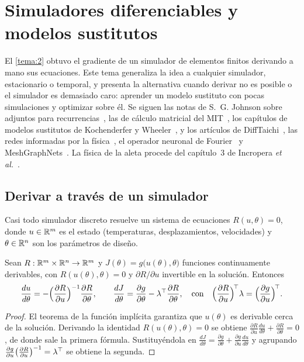 \chapter{Simuladores diferenciables y modelos sustitutos}
\label{tema:3}

El \cref{tema:2} obtuvo el gradiente de un simulador de elementos finitos derivando a mano sus ecuaciones. Este tema generaliza la idea a cualquier simulador, estacionario o temporal, y presenta la alternativa cuando derivar no es posible o el simulador es demasiado caro: aprender un modelo sustituto con pocas simulaciones y optimizar sobre él. Se siguen las notas de S.~G. Johnson sobre adjuntos para recurrencias~\cite{johnson}, las de cálculo matricial del MIT~\cite[§6.3]{mit18s096}, los capítulos de modelos sustitutos de Kochenderfer y Wheeler~\cite{kw}, y los artículos de DiffTaichi~\cite{difftaichi}, las redes informadas por la física~\cite{pinn}, el operador neuronal de Fourier~\cite{fno} y MeshGraphNets~\cite{mgn}. La física de la aleta procede del capítulo~3 de Incropera \emph{et al.}~\cite{incropera}.

\section{Derivar a través de un simulador}

Casi todo simulador discreto resuelve un sistema de ecuaciones $R(u,\theta)=0$, donde $u\in\mathbb{R}^m$ es el estado (temperaturas, desplazamientos, velocidades) y $\theta\in\mathbb{R}^n$ son los parámetros de diseño.

\begin{teorema}\label{teo:implicita}
Sean $R:\mathbb{R}^m\times\mathbb{R}^n\to\mathbb{R}^m$ y $J(\theta)=g\bigl(u(\theta),\theta\bigr)$ funciones continuamente derivables, con $R(u(\theta),\theta)=0$ y $\partial R/\partial u$ invertible en la solución. Entonces
\[
\frac{du}{d\theta}=-\Bigl(\frac{\partial R}{\partial u}\Bigr)^{-1}\frac{\partial R}{\partial\theta},\qquad
\frac{dJ}{d\theta}=\frac{\partial g}{\partial\theta}-\lambda^\top\frac{\partial R}{\partial\theta},\quad\text{con}\quad\Bigl(\frac{\partial R}{\partial u}\Bigr)^{\!\top}\lambda=\Bigl(\frac{\partial g}{\partial u}\Bigr)^{\!\top}.
\]
\end{teorema}

\begin{proof}
El teorema de la función implícita garantiza que $u(\theta)$ es derivable cerca de la solución. Derivando la identidad $R(u(\theta),\theta)=0$ se obtiene $\frac{\partial R}{\partial u}\frac{du}{d\theta}+\frac{\partial R}{\partial\theta}=0$, de donde sale la primera fórmula. Sustituyéndola en $\frac{dJ}{d\theta}=\frac{\partial g}{\partial\theta}+\frac{\partial g}{\partial u}\frac{du}{d\theta}$ y agrupando $\frac{\partial g}{\partial u}\bigl(\frac{\partial R}{\partial u}\bigr)^{-1}=\lambda^\top$ se obtiene la segunda.
\end{proof}

